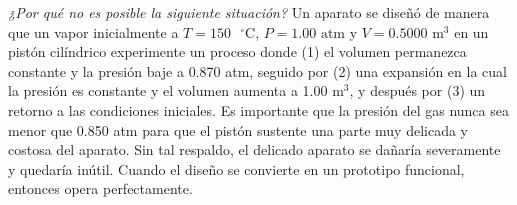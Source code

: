 \item \textit{¿Por qué no es posible la siguiente situación?} Un aparato se diseñó de manera que un vapor inicialmente a $T = 150\text{ }^\circ\text{C}$, $P = 1.00\text{ atm}$ y $V = 0.5000\text{ m}^3$ en un pistón cilíndrico experimente un proceso donde (1) el volumen permanezca constante y la presión baje a 0.870 atm, seguido por (2) una expansión en la cual la presión es constante y el volumen aumenta a 1.00 m$^3$, y después por (3) un retorno a las condiciones iniciales. Es importante que la presión del gas nunca sea menor que 0.850 atm para que el pistón sustente una parte muy delicada y costosa del aparato. Sin tal respaldo, el delicado aparato se dañaría severamente y quedaría inútil. Cuando el diseño se convierte en un prototipo funcional, entonces opera perfectamente.
